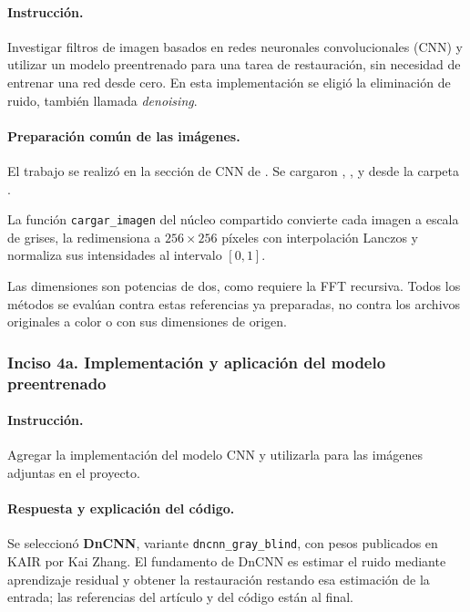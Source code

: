 \documentclass[11pt]{article}
\begin{document}
\paragraph{Instrucción.}

Investigar filtros de imagen basados en redes neuronales
convolucionales (CNN) y utilizar un modelo preentrenado para
una tarea de restauración, sin necesidad de entrenar una red
desde cero. En esta implementación se eligió la eliminación
de ruido, también llamada \textit{denoising}.

\paragraph{Preparación común de las imágenes.}

El trabajo se realizó en la sección de CNN de
.
Se cargaron , ,
 y  desde la carpeta
.

La función \texttt{cargar\_imagen} del núcleo compartido
convierte cada imagen a escala de grises, la redimensiona a
$256\times256$ píxeles con interpolación Lanczos y normaliza
sus intensidades al intervalo $[0,1]$.

Las dimensiones son potencias de dos, como requiere la FFT
recursiva. Todos los métodos se evalúan contra estas
referencias ya preparadas, no contra los archivos originales
a color o con sus dimensiones de origen.

\subsubsection*{
    Inciso 4a. Implementación y aplicación del modelo preentrenado
}

\paragraph{Instrucción.}

Agregar la implementación del modelo CNN y utilizarla para
las imágenes adjuntas en el proyecto.

\paragraph{Respuesta y explicación del código.}

Se seleccionó \textbf{DnCNN}, variante
\texttt{dncnn\_gray\_blind}, con pesos publicados en KAIR por
Kai Zhang. El fundamento de DnCNN es estimar el ruido
mediante aprendizaje residual y obtener la restauración
restando esa estimación de la entrada; las referencias del
artículo y del código están al final.
\end{document}
